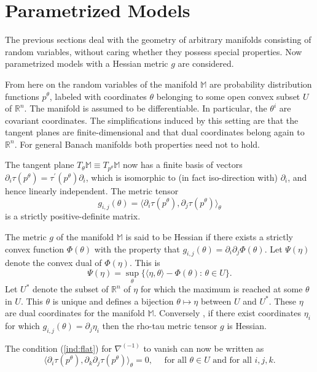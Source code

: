 \documentclass[graybox]{svmult}
\newcommand{\be}{\begin{equation}}
\newcommand{\ee}{\end{equation}}
\newcommand{\Mo}{\mathbb M}
\newcommand{\Ro}{\mathbb R}
\begin{document}
\section{Parametrized Models}
\label{sect:param}

The previous sections deal with the geometry of arbitrary manifolds consisting of random variables,
without caring whether they possess special properties. Now parametrized models 
with a Hessian  metric $g$ are considered.

From here on the random variables of the manifold $\Mo$ are probability distribution functions $p^\theta$,
labeled with coordinates $\theta$ belonging to some open convex subset $U$ of $\Ro^n$.
The manifold is assumed to be differentiable. In particular, the $\theta^i$ are covariant coordinates.
The simplifications induced by this setting are that the tangent planes are finite-dimensional
and that dual coordinates belong again to $\Ro^n$. For general Banach manifolds
both properties need not to hold.

The tangent plane $T_\theta\Mo\equiv T_{p^\theta}\Mo$
now has a finite basis of vectors $\partial_i\tau(p^\theta) = \tau^\prime(p^\theta) \partial_i$, which is isomorphic to (in fact iso-direction with) $\partial_i$, and hence linearly independent. The metric tensor 
\be
g_{i,j}(\theta)=\langle \partial_i\tau(p^\theta),\partial_j\tau(p^\theta)\rangle_\theta
\nonumber
\ee
is a strictly positive-definite matrix.

The metric $g$ of the manifold $\Mo$ is said to be Hessian if there exists a strictly convex function
$\Phi(\theta)$ with the property that
$g_{i,j}(\theta)=\partial_i\partial_j\Phi(\theta)$.
Let $\Psi(\eta)$ denote the convex dual of $\Phi(\eta)$. This is
\be
\Psi(\eta)=\sup_{\theta}\{\langle\eta,\theta\rangle-\Phi(\theta):\,\theta\in U\}.
\nonumber
\ee
Let $U^*$ denote the subset of $\Ro^n$ of $\eta$ for which the maximum is reached
at some $\theta$ in $U$. This $\theta$ is unique and defines a bijection
$\theta\mapsto\eta$ between $U$ and $U^*$. These $\eta$ are dual coordinates for the manifold $\Mo$.
Conversely \cite{NZ17}, if there exist
coordinates $\eta_i$ for which $g_{i,j}(\theta)=\partial_j\eta_i$ then 
the rho-tau metric tensor $g$ is Hessian.


The condition (\ref {ind:flat}) for $\nabla^{(-1)}$ to vanish can now be written as
\be
\langle\partial_i\tau(p^\theta),\partial_k\partial_j\tau(p^\theta)\rangle_\theta=0,
\quad\mbox{ for all }\theta\in U\mbox{ and for all }i,j,k.
\label{ind:flat2}
\ee
\end{document}
